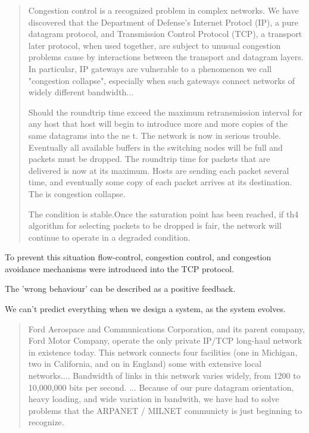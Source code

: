 \begin{quote}
Congestion control is a recognized problem in complex networks. We have discovered that the
Department of Defense's Internet Protocl (IP), a pure datagram protocol, and Transmission Control
Protocol (TCP), a transport later protocol, when used together, are subject to unusual congestion
problems cause by interactions between the transport and datagram layers. In particular, IP gateways
are vulnerable to a phenomenon we call "congestion collapse", especially when such gateways connect
networks of widely different bandwidth...

Should the roundtrip time exceed the maximum retransmission interval for any host that host will
    begin to introduce more and more copies of the same datagrams into the ne t. The network is now
    in serious trouble. Eventually all available buffers in the switching nodes will be full and
    packets must be dropped. The roundtrip time for packets that are delivered is now at its
    maximum. Hosts are sending each packet several time, and eventually some copy of each packet
    arrives at its destination. The is congestion collapse.

The condition is stable.Once the saturation point has been reached, if th4 algorithm for selecting
    packets to be dropped is fair, the network will continue to operate in a degraded condition.
\end{quote}

To prevent this situation flow-control, congestion control, and congestion avoidance mechanisms were
introduced into the TCP protocol.

The 'wrong behaviour' can be described as a positive feedback.


We can't predict everything when we design a system, as the system evolves.

\begin{quote}
Ford Aerospace and Communications Corporation, and its parent company, Ford Motor Company, operate
    the only private IP/TCP long-haul network in existence today. This network connects four
    facilities (one in Michigan, two in California, and on in England) some with extensive local
    networks.... Bandwidth of links in this network varies widely, from 1200 to 10,000,000 bits per
    second. ... Because of our pure datagram orientation, heavy loading, and wide variation in
    bandwith, we have had to solve problems that the ARPANET / MILNET communicty is just beginning
    to recognize.
\end{quote}

